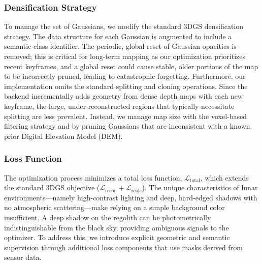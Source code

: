 \subsubsection{Densification Strategy}
To manage the set of Gaussians, we modify the standard 3DGS densification strategy. The data structure for each Gaussian is augmented to include a semantic class identifier. The periodic, global reset of Gaussian opacities is removed; this is critical for long-term mapping as our optimization prioritizes recent keyframes, and a global reset could cause stable, older portions of the map to be incorrectly pruned, leading to catastrophic forgetting. Furthermore, our implementation omits the standard splitting and cloning operations. Since the backend incrementally adds geometry from dense depth maps with each new keyframe, the large, under-reconstructed regions that typically necessitate splitting are less prevalent. Instead, we manage map size with the voxel-based filtering strategy and by pruning Gaussians that are inconsistent with a known prior Digital Elevation Model (DEM).

\subsubsection{Loss Function}
The optimization process minimizes a total loss function, $\mathcal{L}_{\text{total}}$, which extends the standard 3DGS objective ($\mathcal{L}_{\text{recon}} + \mathcal{L}_{\text{scale}}$). The unique characteristics of lunar environments—namely high-contrast lighting and deep, hard-edged shadows with no atmospheric scattering—make relying on a simple background color insufficient. A deep shadow on the regolith can be photometrically indistinguishable from the black sky, providing ambiguous signals to the optimizer. To address this, we introduce explicit geometric and semantic supervision through additional loss components that use masks derived from sensor data.

